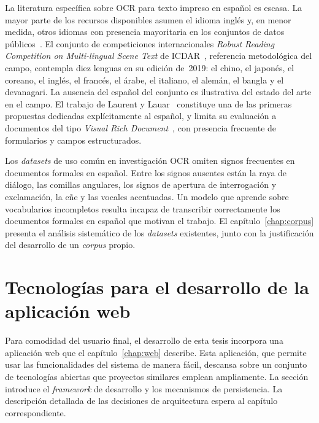 La literatura específica sobre OCR para texto impreso en español es escasa. La mayor parte de los recursos disponibles asumen el idioma inglés y, en menor medida, otros idiomas con presencia mayoritaria en los conjuntos de datos públicos~\cite{laurent2024spanishtrocr}. El conjunto de competiciones internacionales \textit{Robust Reading Competition on Multi-lingual Scene Text} de ICDAR~\cite{nayef2019icdarmlt}, referencia metodológica del campo, contempla diez lenguas en su edición de~2019: el chino, el japonés, el coreano, el inglés, el francés, el árabe, el italiano, el alemán, el bangla y el devanagari. La ausencia del español del conjunto es ilustrativa del estado del arte en el campo. El trabajo de Laurent y Lauar~\cite{laurent2024spanishtrocr} constituye una de las primeras propuestas dedicadas explícitamente al español, y limita su evaluación a documentos del tipo \textit{Visual Rich Document}~\cite{laurent2024spanishtrocr}, con presencia frecuente de formularios y campos estructurados.


Los \textit{datasets} de uso común en investigación OCR omiten signos frecuentes en documentos formales en español. Entre los signos ausentes están la raya de diálogo, las comillas angulares, los signos de apertura de interrogación y exclamación, la eñe y las vocales acentuadas. Un modelo que aprende sobre vocabularios incompletos resulta incapaz de transcribir correctamente los documentos formales en español que motivan el trabajo. El capítulo~\ref{chap:corpus} presenta el análisis sistemático de los \textit{datasets} existentes, junto con la justificación del desarrollo de un \textit{corpus} propio.


\section{Tecnologías para el desarrollo de la aplicación web}
\label{sec:tecnologias-web}

Para comodidad del usuario final, el desarrollo de esta tesis incorpora una aplicación web que el capítulo~\ref{chap:web} describe. Esta aplicación, que permite usar las funcionalidades del sistema de manera fácil, descansa sobre un conjunto de tecnologías abiertas que proyectos similares emplean ampliamente. La sección introduce el \textit{framework} de desarrollo y los mecanismos de persistencia. La descripción detallada de las decisiones de arquitectura espera al capítulo correspondiente.

